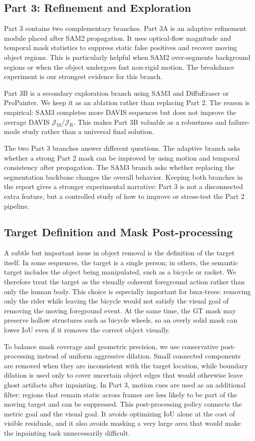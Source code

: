 \documentclass[10pt,twocolumn,letterpaper]{article}
\newcommand{\jm}{\ensuremath{\mathcal{J}_{\mathrm{M}}}}
\newcommand{\jr}{\ensuremath{\mathcal{J}_{\mathrm{R}}}}
\begin{document}
\subsection{Part 3: Refinement and Exploration}
Part 3 contains two complementary branches. Part 3A is an adaptive refinement module placed after SAM2 propagation. It uses optical-flow magnitude and temporal mask statistics to suppress static false positives and recover moving object regions. This is particularly helpful when SAM2 over-segments background regions or when the object undergoes fast non-rigid motion. The breakdance experiment is our strongest evidence for this branch.

Part 3B is a secondary exploration branch using SAM3 and DiffuEraser or ProPainter. We keep it as an ablation rather than replacing Part 2. The reason is empirical: SAM3 completes more DAVIS sequences but does not improve the average DAVIS \jm/\jr. This makes Part 3B valuable as a robustness and failure-mode study rather than a universal final solution.

The two Part 3 branches answer different questions. The adaptive branch asks whether a strong Part 2 mask can be improved by using motion and temporal consistency after propagation. The SAM3 branch asks whether replacing the segmentation backbone changes the overall behavior. Keeping both branches in the report gives a stronger experimental narrative: Part 3 is not a disconnected extra feature, but a controlled study of how to improve or stress-test the Part 2 pipeline.

\subsection{Target Definition and Mask Post-processing}
A subtle but important issue in object removal is the definition of the target itself. In some sequences, the target is a single person; in others, the semantic target includes the object being manipulated, such as a bicycle or racket. We therefore treat the target as the visually coherent foreground action rather than only the human body. This choice is especially important for bmx-trees: removing only the rider while leaving the bicycle would not satisfy the visual goal of removing the moving foreground event. At the same time, the GT mask may preserve hollow structures such as bicycle wheels, so an overly solid mask can lower IoU even if it removes the correct object visually.

To balance mask coverage and geometric precision, we use conservative post-processing instead of uniform aggressive dilation. Small connected components are removed when they are inconsistent with the target location, while boundary dilation is used only to cover uncertain object edges that would otherwise leave ghost artifacts after inpainting. In Part 3, motion cues are used as an additional filter: regions that remain static across frames are less likely to be part of the moving target and can be suppressed. This post-processing policy connects the metric goal and the visual goal. It avoids optimizing IoU alone at the cost of visible residuals, and it also avoids masking a very large area that would make the inpainting task unnecessarily difficult.
\end{document}
